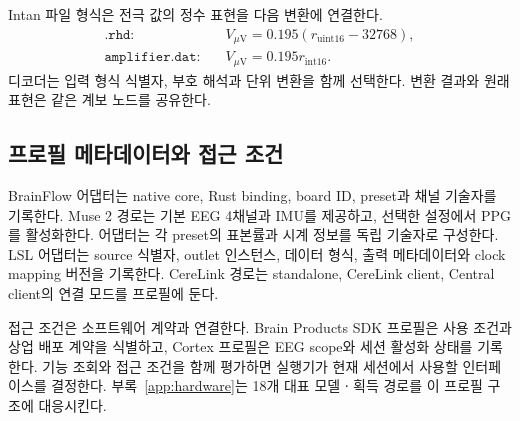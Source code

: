 Intan 파일 형식은 전극 값의 정수 표현을 다음 변환에 연결한다\cite{intan_file}.
\begin{equation}
 \begin{aligned}
 \texttt{.rhd}:\quad &V_{\mu\mathrm V}=0.195(r_{\mathrm{uint16}}-32768),\\
 \texttt{amplifier.dat}:\quad &V_{\mu\mathrm V}=0.195r_{\mathrm{int16}}.
 \end{aligned}
\end{equation}
디코더는 입력 형식 식별자, 부호 해석과 단위 변환을 함께 선택한다.
변환 결과와 원래 표현은 같은 계보 노드를 공유한다.

\subsection{프로필 메타데이터와 접근 조건}
BrainFlow 어댑터는 native core, Rust binding, board ID, preset과 채널 기술자를 기록한다.
Muse 2 경로는 기본 EEG 4채널과 IMU를 제공하고, 선택한 설정에서 PPG를 활성화한다.
어댑터는 각 preset의 표본률과 시계 정보를 독립 기술자로 구성한다\cite{brainflow_boards}.
LSL 어댑터는 source 식별자, outlet 인스턴스, 데이터 형식, 출력 메타데이터와
clock mapping 버전을 기록한다\cite{brainflow_build,lsl_bindings,lsl_time}.
CereLink 경로는 standalone, CereLink client, Central client의 연결 모드를 프로필에 둔다\cite{cerelink}.

접근 조건은 소프트웨어 계약과 연결한다. Brain Products SDK 프로필은 사용 조건과
상업 배포 계약을 식별하고\cite{brainproducts_sdk}, Cortex 프로필은 EEG scope와
세션 활성화 상태를 기록한다\cite{cortex_subscription}.
기능 조회와 접근 조건을 함께 평가하면 실행기가 현재 세션에서 사용할 인터페이스를 결정한다.
부록~\ref{app:hardware}는 18개 대표 모델ㆍ획득 경로를 이 프로필 구조에 대응시킨다.
